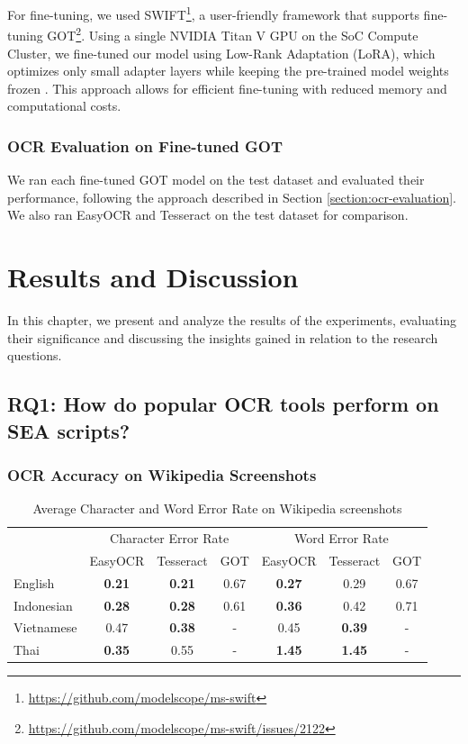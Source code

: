 \documentclass[12pt,oneside]{memoir}
\begin{document}
For fine-tuning, we used SWIFT\footnote{\url{https://github.com/modelscope/ms-swift}}, a user-friendly framework that supports fine-tuning GOT\footnote{\url{https://github.com/modelscope/ms-swift/issues/2122}}. 
Using a single NVIDIA Titan V GPU on the SoC Compute Cluster, we fine-tuned our model using Low-Rank Adaptation (LoRA), which optimizes only small adapter layers while keeping the pre-trained model weights frozen \parencite{hu-etal-2021}.
This approach allows for efficient fine-tuning with reduced memory and computational costs.

\subsection{OCR Evaluation on Fine-tuned GOT}

We ran each fine-tuned GOT model on the test dataset and evaluated their performance, following the approach described in Section \ref{section:ocr-evaluation}.
We also ran EasyOCR and Tesseract on the test dataset for comparison.

\chapter{Results and Discussion}

In this chapter, we present and analyze the results of the experiments, evaluating their significance and discussing the insights gained in relation to the research questions.

\section{RQ1: How do popular OCR tools perform on SEA scripts?}

\subsection{OCR Accuracy on Wikipedia Screenshots} \label{section:ocr-accuracy-on-wikipedia-screenshots}

\begin{table}[ht]
    \centering
    \caption{Average Character and Word Error Rate on Wikipedia screenshots}
    \label{table:ocr-accuracy-on-real-world-data}
    \begin{tabular}{lcccccc}
        \toprule
        & \multicolumn{3}{c}{Character Error Rate} & \multicolumn{3}{c}{Word Error Rate}\\
        \cmidrule(lr){2-4}\cmidrule(lr){5-7}
        & EasyOCR & Tesseract & GOT & EasyOCR & Tesseract & GOT\\
        \midrule
        English & \textbf{0.21} & \textbf{0.21} & 0.67 & \textbf{0.27} & 0.29 & 0.67\\
        Indonesian & \textbf{0.28} & \textbf{0.28} & 0.61 & \textbf{0.36} & 0.42 & 0.71\\
        Vietnamese & 0.47 & \textbf{0.38} & - & 0.45 & \textbf{0.39} & -\\
        Thai & \textbf{0.35} & 0.55 & - & \textbf{1.45} & \textbf{1.45} & -\\
        \bottomrule
    \end{tabular}
\end{table}
\end{document}

